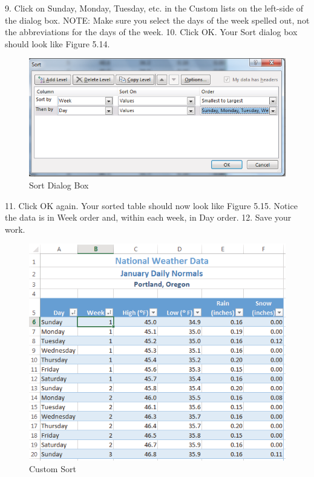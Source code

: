 9. Click on Sunday, Monday, Tuesday, etc. in the Custom lists on the left-side of the dialog box.
NOTE: Make sure you select the days of the week spelled out, not the abbreviations for the days
of the week.
10. Click OK. Your Sort dialog box should look like Figure 5.14.


\begin{figure}[H]
	\centering
	\includegraphics[width=\maxwidth{.95\linewidth}]{gfx/ch05_fig14}
	\caption{Sort Dialog Box}
	\label{05:fig14}
\end{figure}





11. Click OK again. Your sorted table should now look like Figure 5.15. Notice the data is in Week
order and, within each week, in Day order.
12. Save your work.


\begin{figure}[H]
	\centering
	\includegraphics[width=\maxwidth{.95\linewidth}]{gfx/ch05_fig15}
	\caption{Custom Sort}
	\label{05:fig15}
\end{figure}








